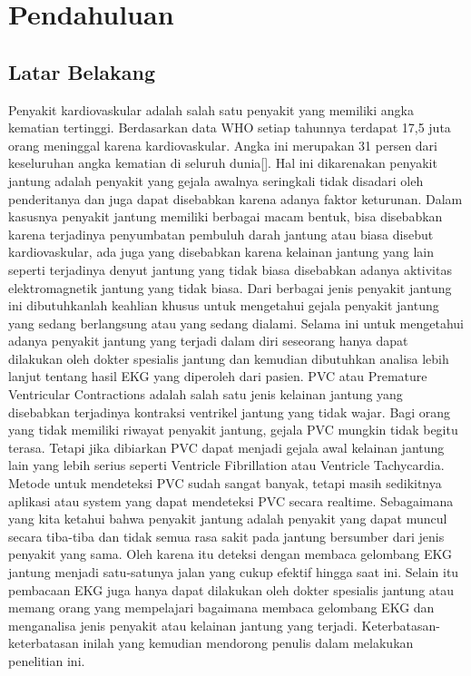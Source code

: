 \chapter{Pendahuluan}
\section{Latar Belakang}
Penyakit kardiovaskular adalah salah satu penyakit yang memiliki angka kematian tertinggi. Berdasarkan data WHO setiap tahunnya terdapat 17,5 juta orang meninggal karena kardiovaskular. Angka ini merupakan 31 persen dari keseluruhan angka kematian di seluruh dunia[]. Hal ini dikarenakan penyakit jantung adalah penyakit yang gejala awalnya seringkali tidak disadari oleh penderitanya dan juga dapat disebabkan karena adanya faktor keturunan. Dalam kasusnya penyakit jantung memiliki berbagai macam bentuk, bisa disebabkan karena terjadinya penyumbatan pembuluh darah jantung atau biasa disebut kardiovaskular, ada juga yang disebabkan karena kelainan jantung yang lain seperti terjadinya denyut jantung yang tidak biasa disebabkan adanya aktivitas elektromagnetik jantung yang tidak biasa. Dari berbagai jenis penyakit jantung ini dibutuhkanlah keahlian khusus untuk mengetahui gejala penyakit jantung yang sedang berlangsung atau yang sedang dialami. Selama ini untuk mengetahui adanya penyakit jantung yang terjadi dalam diri seseorang hanya dapat dilakukan oleh dokter spesialis jantung dan kemudian dibutuhkan analisa lebih lanjut tentang hasil EKG yang diperoleh dari pasien. PVC atau Premature Ventricular Contractions adalah salah satu jenis kelainan jantung yang disebabkan terjadinya kontraksi ventrikel jantung yang tidak wajar. Bagi orang yang tidak memiliki riwayat penyakit jantung, gejala PVC mungkin tidak begitu terasa. Tetapi jika dibiarkan PVC dapat menjadi gejala awal kelainan jantung lain yang lebih serius seperti Ventricle Fibrillation atau Ventricle Tachycardia. Metode untuk mendeteksi PVC sudah sangat banyak, tetapi masih sedikitnya aplikasi atau system yang dapat mendeteksi PVC secara realtime. Sebagaimana yang kita ketahui bahwa penyakit jantung adalah penyakit yang dapat muncul secara tiba-tiba dan tidak semua rasa sakit pada jantung bersumber dari jenis penyakit yang sama. Oleh karena itu deteksi dengan membaca gelombang EKG jantung menjadi satu-satunya jalan yang cukup efektif hingga saat ini. Selain itu pembacaan EKG juga hanya dapat dilakukan oleh dokter spesialis jantung atau memang orang yang mempelajari bagaimana membaca gelombang EKG dan menganalisa jenis penyakit atau kelainan jantung yang terjadi. Keterbatasan-keterbatasan inilah yang kemudian mendorong penulis dalam melakukan penelitian ini. 
